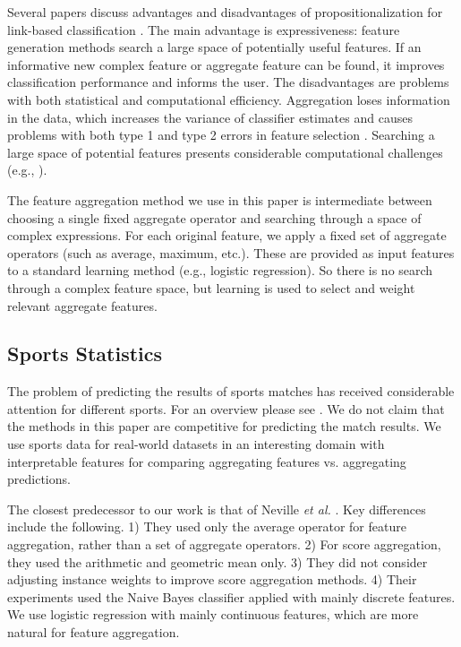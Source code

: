 \documentclass[conference]{IEEEtran}
\begin{document}
Several papers discuss advantages and disadvantages of  propositionalization for link-based classification \cite{DavidJensen2002,han2009}.
The main advantage is expressiveness: feature generation methods search a large space of potentially useful features. If an informative new complex feature or aggregate feature can be found, it improves classification performance and informs the user. The disadvantages are problems with both statistical and computational efficiency. Aggregation loses information in the data, which increases the variance of classifier estimates and causes problems with both type 1 and type 2 errors in feature selection \cite{DavidJensen2002}. Searching a large space of potential features presents considerable computational challenges %
(e.g., \cite[Ch.16.1.2]{Popescul2007}).

The feature aggregation method we use in this paper is intermediate between choosing a single fixed aggregate operator and searching through a space of complex expressions. For each original %
feature, we apply a fixed set of aggregate operators (such as average, maximum, etc.). These are provided as input features to a standard learning method (e.g., logistic regression). So there is no search through a complex feature space, but learning is used to select and weight relevant aggregate features.



\subsection{Sports Statistics} The problem of predicting the results of sports matches has received considerable attention for different sports. For an overview please see \cite{Schumaker2010}. We do not claim that the methods in this paper are competitive for predicting the match results.
We use sports data for real-world datasets in an interesting domain with interpretable features for comparing aggregating features vs. aggregating predictions.

The closest predecessor to our work is that of Neville {\em et al.} \cite{Neville2003}. Key differences include the following. 1) They used only the average operator for feature aggregation, rather than a set of aggregate operators. 2)  For score aggregation, they used the arithmetic and geometric mean only. 3) They did not consider adjusting instance weights to improve score aggregation methods. 4) Their experiments used the Naive Bayes classifier applied with mainly discrete features. We use logistic regression with mainly continuous features, which are more natural for feature aggregation.
\end{document}
